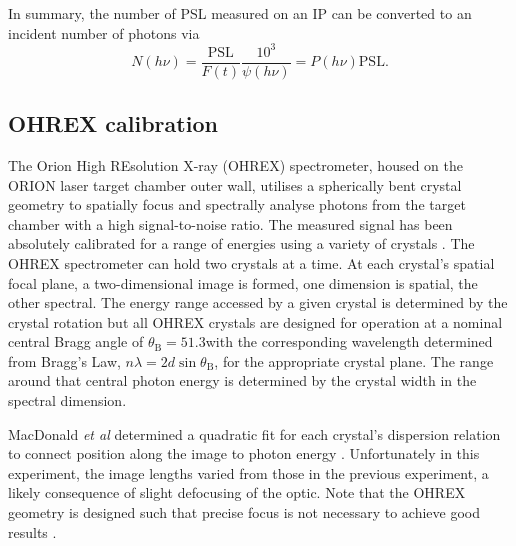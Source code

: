 In summary, the number of PSL measured on an IP can be converted to an incident number of photons via
\begin{equation}
	N(h\nu) = \frac{\mathrm{PSL}}{F(t)}\frac{10^3}{\psi(h\nu)} = P(h\nu) \mathrm{PSL}.
\end{equation}

\subsection{OHREX calibration}
The Orion High REsolution X-ray (OHREX) spectrometer, housed on the ORION laser target chamber outer wall, utilises a spherically bent crystal geometry to spatially focus and spectrally analyse photons from the target chamber \cite{beiersdorferLineshapeSpectroscopyVery2016} with a high signal-to-noise ratio. The measured signal has been absolutely calibrated for a range of energies using a variety of crystals \cite{macdonaldAbsoluteThroughputCalibration2021}. The OHREX spectrometer can hold two crystals at a time. At each crystal's spatial focal plane, a two-dimensional image is formed, one dimension is spatial, the other spectral. The energy range accessed by a given crystal is determined by the crystal rotation but all OHREX crystals are designed for operation at a nominal central Bragg angle of $\theta_\mathrm{B} = 51.3$\degree with the corresponding wavelength determined from Bragg's Law, $n\lambda = 2d\sin\theta_\mathrm{B}$, for the appropriate crystal plane. The range around that central photon energy is determined by the crystal width in the spectral dimension.

MacDonald \textit{et al} determined a quadratic fit for each crystal's dispersion relation to connect position along the image to photon energy \cite{macdonaldAbsoluteThroughputCalibration2021}. Unfortunately in this experiment, the image lengths varied from those in the previous experiment, a likely consequence of slight defocusing of the optic. Note that the OHREX geometry is designed such that precise focus is not necessary to achieve good results \cite{beiersdorferLineshapeSpectroscopyVery2016}.

